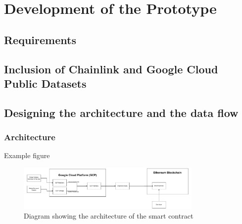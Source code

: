\chapter{Development of the Prototype}\label{chapter:development_prototype}
\section{Requirements}\label{section:requirements}



\section{Inclusion of Chainlink and Google Cloud Public Datasets}\label{section:inclusion_chainlink_google_cloud_datasets}
\section{Designing the architecture and the data flow}\label{section:designing_architecture_data_flow}

\subsection{Architecture}

Example figure

\begin{figure}[h]
    \centering
    \includegraphics[width=0.8\textwidth]{figures/architecture-overview.drawio.pdf}
    \caption{Diagram showing the architecture of the smart contract}
    \label{fig:architecture}
\end{figure}